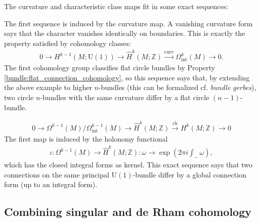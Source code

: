     The curvature and characteristic class maps fit in some exact sequences:
    \begin{property}
        The first sequence is induced by the curvature map. A vanishing curvature form says that the character vanishes identically on boundaries. This is exactly the property satisfied by cohomology classes:
        \begin{gather}
            0\longrightarrow H^{k-1}(M;\mathrm{U}(1))\longrightarrow\hat{H}^k(M;\mathbb{Z})\overset{\mathrm{curv}}{\longrightarrow}\Omega^k_\text{int}(M)\longrightarrow0.
        \end{gather}
        The first cohomology group classifies flat circle bundles by Property \ref{bundle:flat_connection_cohomology}, so this sequence says that, by extending the above example to higher $n$-bundles (this can be formalized cf. \textit{bundle gerbes}), two circle $n$-bundles with the same curvature differ by a flat circle $(n-1)$-bundle.
    \end{property}
    \begin{property}
        \begin{gather}
            0\longrightarrow \Omega^{k-1}(M)/\Omega^{k-1}_\text{int}(M)\longrightarrow\hat{H}^k(M;\mathbb{Z})\overset{\mathrm{ch}}{\longrightarrow} H^k(M;\mathbb{Z})\longrightarrow0
        \end{gather}
        The first map is induced by the holonomy functional
        \begin{gather}
            \iota:\Omega^{k-1}(M)\rightarrow\hat{H}^k(M;\mathbb{Z}):\omega\rightarrow\exp\left(2\pi i\int_-\omega\right),
        \end{gather}
        which has the closed integral forms as kernel. This exact sequence says that two connections on the same principal $\mathrm{U}(1)$-bundle differ by a global connection form (up to an integral form).
    \end{property}

\subsection{Combining singular and de Rham cohomology}

